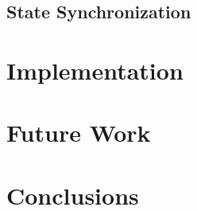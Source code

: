 \documentclass{article}
\begin{document}
\subsection{State Synchronization}
\label{statesynchronization}


\section{Implementation}
\label{implementation}


\section{Future Work}
\label{futurework}


\section{Conclusions}
\label{conclusions}




\end{document}
